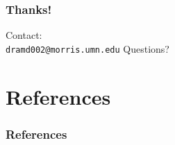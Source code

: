 \documentclass{beamer}
\begin{document}
\begin{frame}
\frametitle{Thanks!}
\begin{center}
Contact: \\ \texttt{dramd002@morris.umn.edu}
\linebreak
\linebreak
\linebreak
{\huge Questions?}
\end{center}
\end{frame}

\section*{References}

\begin{frame}[allowframebreaks] 
\frametitle{References} 
\nocite{*}

{\tiny }
\end{frame}
\end{document}
